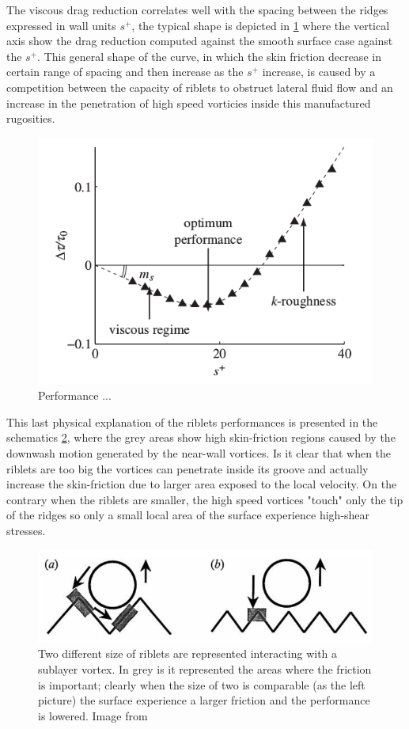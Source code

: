 The viscous drag reduction correlates well with the spacing between the ridges expressed in wall units $ s^+ $, the typical shape is depicted in \ref{fig:riblets_perf} where the vertical axis show the drag reduction computed against the smooth surface case against the $ s^+ $.
This general shape of the curve, in which the skin friction decrease in certain range of spacing and then increase as the $ s^+ $ increase, is caused by a competition between the capacity of riblets to obstruct lateral fluid flow and an increase in the penetration of high speed vorticies inside this manufactured rugosities.

\begin{figure}[h]
	\centering
	\includegraphics[width=0.5\linewidth]{chapter_1/riblets_performance}
	\caption{Performance ... \citet{jimenez2001turbulent} }
	\label{fig:riblets_perf}
\end{figure}

This last physical explanation of the riblets performances is presented in the schematics \ref{fig:riblets_schem}, where the grey areas show high skin-friction regions caused by the downwash motion generated by the near-wall vortices.
Is it clear that when the riblets are too big the vortices can penetrate inside its groove and actually increase the skin-friction due to larger area exposed to the local velocity.
On the contrary when the riblets are smaller, the high speed vortices "touch" only the tip of the ridges so only a small local area of the surface experience high-shear stresses.

\begin{figure}[h]
	\centering
	\includegraphics[width=0.7\linewidth]{chapter_1/riblets1}
	\caption{Two different size of riblets are represented interacting with a sublayer vortex. In grey is it represented the areas where the friction is important; clearly when the size of two is comparable (as the left picture) the surface experience a larger friction and the performance is lowered. Image from \citet{choi1993direct}}
	\label{fig:riblets_schem}
\end{figure}

